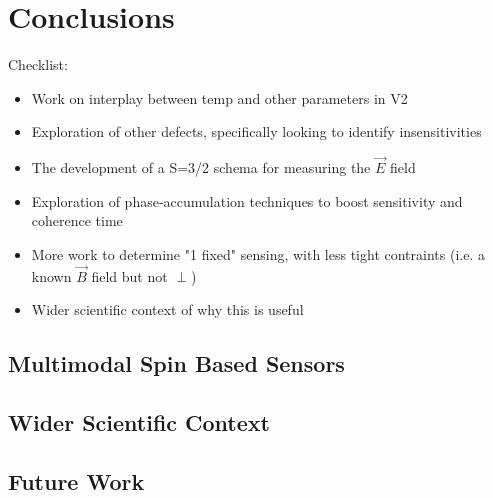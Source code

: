 \chapter{Conclusions}\label{ch:conclusions}
\begin{proposal}{Checklist:}
    \begin{itemize}
        \item Work on interplay between temp and other parameters in V2
        \item Exploration of other defects, specifically looking to identify insensitivities 
        \item The development of a S=3/2 schema for measuring the $\vec{E}$ field 
        \item Exploration of phase-accumulation techniques to boost sensitivity and coherence time
        \item More work to determine "1 fixed" sensing, with less tight contraints (i.e. a known $\vec{B}$ field but not $\perp$)
        \item Wider scientific context of why this is useful
    \end{itemize}
\end{proposal}



\section{Multimodal Spin Based Sensors}
\section{Wider Scientific Context}
\cite{Kraus2013}

\section{Future Work}
%
%
%
%
